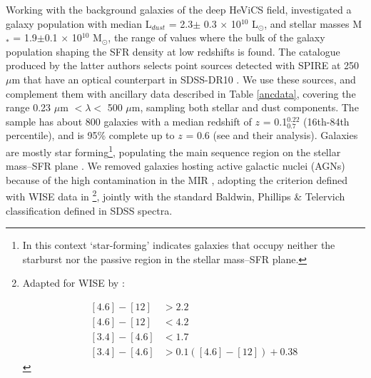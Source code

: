 \documentclass{aa}
\begin{document}
Working with the background galaxies of the deep HeViCS field, \citealt{pap2} investigated a galaxy population with median L$_{dust}$ = 2.3$\pm$ 0.3 $\times$ 10$^{10}$ L$_\odot$, and stellar masses M$_\ast$ = 1.9$\pm$0.1 $\times$ 10$^{10}$ M$_\odot$, the range of values where the bulk of the galaxy population shaping the SFR density at low redshifts is found. The catalogue produced by the latter authors selects point sources detected with SPIRE at 250 $\mu$m \citep{gri} that have an optical counterpart in SDSS-DR10 \citep{ahn}. We use these sources, and complement them with ancillary data described in Table \ref{ancdata}, covering the range 0.23 $\mu$m $< \lambda <$ 500 $\mu$m, sampling both stellar and dust components. The sample has about 800 galaxies with a median redshift of $z$ = 0.1$^{0.22}_{0.7}$ (16th-84th percentile), and is 95\% complete up to $z$ = 0.6 (see \citealt{pap2} and their analysis). Galaxies are mostly star forming\footnote{In this context `star-forming' indicates galaxies that occupy neither the starburst nor the passive region in the stellar mass--SFR plane.}, populating the main sequence region on the stellar mass--SFR plane \citep{spe}. We removed galaxies hosting active galactic nuclei (AGNs) because of the high contamination in the MIR \citep{fri,hat}, adopting the criterion defined with WISE data in \cite{bon}\footnote{Adapted for WISE by \cite{jar}:

\begin{equation*}
\begin{split}
[4.6]-[12] & > 2.2\\
[4.6]-[12] & < 4.2\\
[3.4]-[4.6] & <1.7\\
[3.4]-[4.6] & > 0.1([4.6]-[12]) + 0.38
\end{split}    
\end{equation*}
}, jointly with the standard Baldwin, Phillips \& Telervich \cite[BPT, ][]{bal} classification defined in SDSS spectra.
\end{document}
